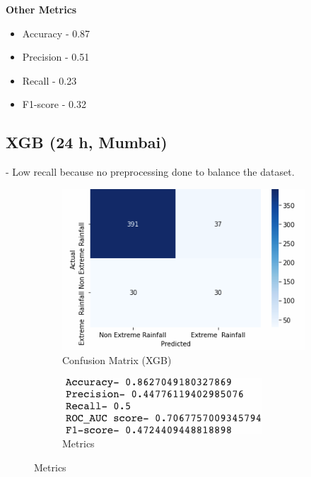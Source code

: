 \documentclass[11pt,a4paper]{article}
\begin{document}
\textbf{\small Other Metrics} \begin{itemize}
\item Accuracy - 0.87
\item Precision - 0.51
\item Recall - 0.23
\item F1-score - 0.32
\end{itemize}

\medskip

\subsection{\textbf{XGB (24 h, Mumbai)}} - Low recall because no preprocessing done to balance the dataset.
\begin{figure}[!ht]
\begin{subfigure}{.5\textwidth}
\centering
\includegraphics[width=\linewidth]{xgb.png}
\caption{Confusion Matrix (XGB)}
\end{subfigure}%
\begin{subfigure}{.5\textwidth}
\centering
\includegraphics[width=.8\linewidth]{xgb_metrics.png}
\caption{Metrics}
\end{subfigure}
\end{figure}

\medskip
\end{document}

